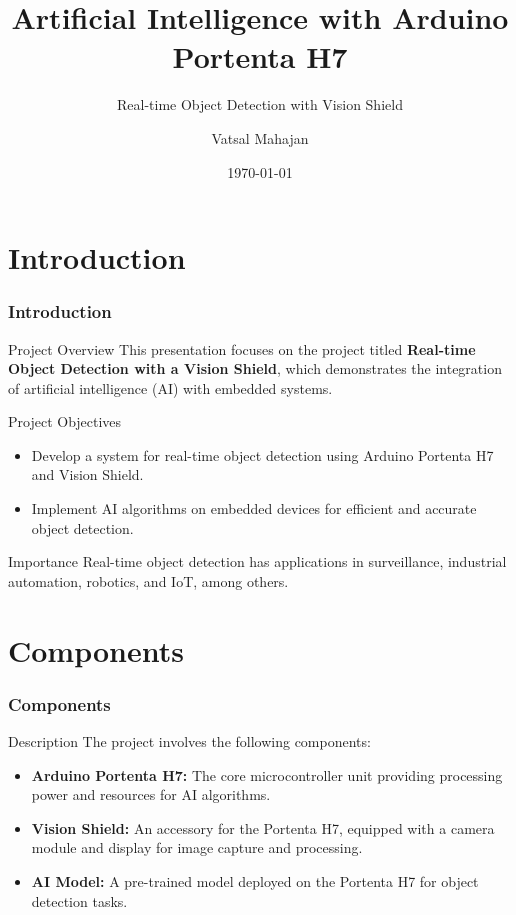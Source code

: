 \documentclass[10pt, a4paper]{beamer}
\title{Artificial Intelligence with Arduino Portenta H7}
\subtitle{Real-time Object Detection with Vision Shield}
\author{Vatsal Mahajan}
\date{\today}
\begin{document}
	


	    \section{Introduction}
		\begin{frame}
		\frametitle{Introduction}
		
		\begin{block}{Project Overview}
			This presentation focuses on the project titled \textbf{Real-time Object Detection with a Vision Shield}, which demonstrates the integration of artificial intelligence (AI) with embedded systems.
		\end{block}
		
		
		\begin{block}{Project Objectives}
			\begin{itemize}
				\item Develop a system for real-time object detection using Arduino Portenta H7 and Vision Shield.
				\item Implement AI algorithms on embedded devices for efficient and accurate object detection.
			\end{itemize}
		\end{block}
		
		\begin{block}{Importance}
			Real-time object detection has applications in surveillance, industrial automation, robotics, and IoT, among others.
		\end{block}
		
		
	\end{frame}
	
	\section{Components}
	\begin{frame}
		\frametitle{Components}
		
		\begin{block}{Description}
			The project involves the following components:
			\begin{itemize}
				\item \textbf{Arduino Portenta H7:} The core microcontroller unit providing processing power and resources for AI algorithms.
				\item \textbf{Vision Shield:} An accessory for the Portenta H7, equipped with a camera module and display for image capture and processing.
				\item \textbf{AI Model:} A pre-trained model deployed on the Portenta H7 for object detection tasks.
			\end{itemize}
		\end{block}
		
	\end{frame}
	
\end{document}
